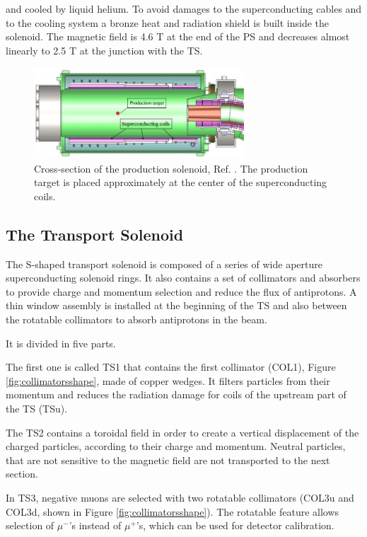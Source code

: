 and cooled by liquid helium. To avoid damages to the superconducting cables and
to the cooling system a bronze heat and radiation shield is built inside the solenoid.
The magnetic field is 4.6 T at the end of the PS and decreases almost linearly to 2.5 T at the
junction with the TS.
\begin{figure}[!h]
    \centering
    \includegraphics[width =0.7\textwidth]{figures/png/800px-Production_solenoid.png}
    \caption[The cross-section of the production solenoid.]{Cross-section of the production solenoid, Ref. \cite{6376120}.
    The production target is placed approximately at the center of the superconducting coils.}
    \label{fig:PS}
    \end{figure}
\subsection{The Transport Solenoid}
The S-shaped transport solenoid is composed of a series of wide aperture superconducting
solenoid rings. It also contains a set of collimators and absorbers to provide charge and 
momentum selection and reduce the flux of antiprotons.
A thin window assembly is installed at the 
beginning of the TS and also between the rotatable collimators to absorb antiprotons in 
the beam. 

It is divided in five parts. 

The first one is called TS1 that contains the first collimator (COL1), 
Figure \ref{fig:collimatorsshape}, made of copper wedges. 
It filters particles from their momentum and reduces the radiation damage for coils of the 
upstream part of the TS (TSu). 

The TS2 contains a toroidal field in order to create a 
vertical displacement of the charged particles,
according to their charge and momentum.
Neutral particles, that are not sensitive to the magnetic 
field are not transported to the next section.

In TS3, negative muons are selected with two rotatable collimators (COL3u and COL3d, 
shown in Figure \ref{fig:collimatorsshape}). 
The rotatable feature allows selection of $\mu^-$'s instead of $\mu^+$'s, which can 
be used for detector calibration. 

